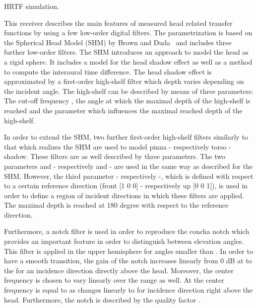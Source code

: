 HRTF simulation.

This receiver describes the main features of measured head related transfer 
functions by using a few low-order digital filters. The parametrization is 
based on the Spherical Head Model (SHM) by Brown and Duda~\cite{BrownDuda} 
and includes three further low-order filters. The SHM introduces an approach 
to model the head as a rigid sphere. It includes a model for the head shadow 
effect as well as a method to compute the interaural time difference. 
The head shadow effect is approximated by a first-order high-shelf filter 
which depth varies depending on the incident angle. The high-shelf can be 
described by means of three parameters: The cut-off frequency , 
the angle  at which the maximal depth of the high-shelf is 
reached and the parameter  which influences the maximal 
reached depth of the high-shelf.

In order to extend the SHM, two further first-order high-shelf filters 
similarly to that which realizes the SHM are used to model pinna 
- respectively torso - shadow. These filters are as well described by 
three parameters. The two parameters  and 
 - respectively  and 
 - are used in the same way as described for the SHM. 
However, the third parameter  - respectively 
 -, which is defined with respect to a certain 
reference direction (front [1 0 0] - respectively up [0 0 1]), is used 
in order to define a region of incident directions in which these filters 
are applied. The maximal depth is reached at 180 degree with respect to 
the reference direction. 

Furthermore, a notch filter is used in order to reproduce the concha notch 
which provides an important feature in order to distinguish between elevation 
angles. This filter is applied in the upper hemisphere for angles smaller 
than . In order to have a smooth transition, the 
gain of the notch increases linearly from 0 dB at  
to the  for an incidence direction directly above the head. 
Moreover, the center frequency is chosen to vary linearly over the range 
as well. At  the center frequency is equal to 
 as changes linearly to  for incidence 
direction right above the head. Furthermore, the notch is described by the 
quality factor .

